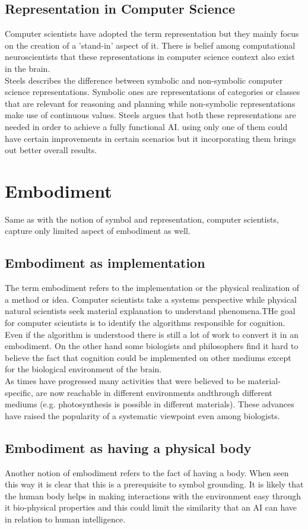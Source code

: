 \documentclass{article}
\begin{document}
	\subsection{Representation in Computer Science}
	Computer scientists have adopted the term representation but they mainly focus on the creation of a 'stand-in' aspect of it. There is belief among computational neuroscientists that these representations in computer science context also exist in the brain. \\
	Steels describes the difference	between symbolic and non-symbolic computer science representations. Symbolic ones are representations of categories or classes that are relevant for reasoning and planning while non-symbolic representations make use of continuous values. Steels argues that both these representations are needed in order to achieve a fully functional AI. using only one of them could have certain improvements in certain scenarios but it incorporating them brings out better overall results.
	\section{Embodiment}
	Same as with the notion of symbol and representation, computer scientists, capture only limited aspect of embodiment as well.
	\subsection{Embodiment as implementation}
	The term embodiment refers to the implementation or the physical realization of a method or idea. Computer scientists take a systems perspective while physical natural scientists seek material explanation to understand phenomena.THe goal for computer scientists is to identify the algorithms responsible for cognition. Even if the algorithm is understood there is still a lot of work to convert it in an embodiment. On the other hand some biologists and philosophers find it hard to believe the fact that cognition could be implemented on other mediums except for the biological environment of the brain. \\
	As times have progressed many activities that were believed to be material-specific, are now reachable in different environments andthrough different mediums (e.g. photosynthesis is possible in different materials).
	These advances have raised the popularity of a systematic viewpoint even among biologists.
	\subsection{Embodiment as having a physical body}
	Another notion of embodiment refers to the fact of having a body. When seen this way it is clear that this is a prerequisite to symbol grounding. It is likely that the human body helps in making interactions with the environment easy through it bio-physical properties and this could limit the similarity that an AI can have in relation to human intelligence.
\end{document}
